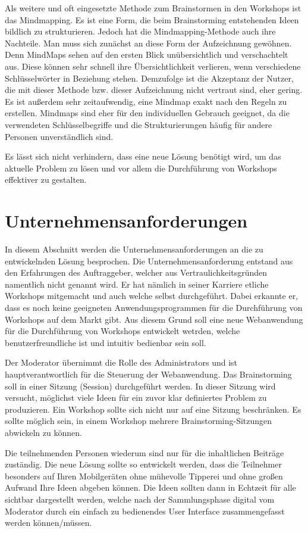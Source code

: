 Als weitere und oft eingesetzte Methode zum Brainstormen in den Workshops ist das Mindmapping. Es ist eine Form, die beim Brainstorming entstehenden Ideen bildlich zu strukturieren. Jedoch hat die Mindmapping-Methode auch ihre Nachteile. Man muss sich zunächst an diese Form der Aufzeichnung gewöhnen. Denn MindMaps sehen auf den ersten Blick unübersichtlich und verschachtelt aus. Diese können sehr schnell ihre Übersichtlichkeit verlieren, wenn verschiedene Schlüsselwörter in Beziehung stehen. Demzufolge ist die Akzeptanz der Nutzer, die mit dieser Methode bzw. dieser Aufzeichnung nicht vertraut sind, eher gering. Es ist außerdem sehr zeitaufwendig, eine Mindmap exakt nach den Regeln zu erstellen. Mindmaps sind eher für den individuellen Gebrauch geeignet, da die verwendeten Schlüsselbegriffe und die Strukturierungen häufig für andere Personen unverständlich sind.\bigskip

Es lässt sich nicht verhindern, dass eine neue Lösung benötigt wird, um das aktuelle Problem zu lösen und vor allem die Durchführung von Workshops effektiver zu gestalten.

\section{Unternehmensanforderungen}
\label{sec:unternehmensanforderungen}
In diesem Abschnitt werden die Unternehmensanforderungen an die zu entwickelnden Lösung besprochen. Die Unternehmensanforderung entstand aus den Erfahrungen des Auftraggeber, welcher aus Vertraulichkeitsgründen namentlich nicht genannt wird. Er hat nämlich in seiner Karriere etliche Workshops mitgemacht und auch welche selbst durchgeführt. Dabei erkannte er, dass es noch keine geeigneten Anwendungsprogrammen für die Durchführung von Workshops auf dem Markt gibt. Aus diesem Grund soll eine neue Webanwendung für die Durchführung von Workshops entwickelt wetrden, welche benutzerfreundliche ist und intuitiv bedienbar sein soll.\bigskip

Der Moderator übernimmt die Rolle des Administrators und ist hauptverantwortlich für die Steuerung der Webanwendung. Das Brainstorming soll in einer Sitzung (Session) durchgeführt werden. In dieser Sitzung wird versucht, möglichst viele Ideen für ein zuvor klar definiertes Problem zu produzieren. Ein Workshop sollte sich nicht nur auf eine Sitzung beschränken. Es sollte möglich sein, in einem Workshop mehrere Brainstorming-Sitzungen abwickeln zu können.\bigskip

Die teilnehmenden Personen wiederum sind nur für die inhaltlichen Beiträge zuständig. Die neue Lösung sollte so entwickelt werden, dass die Teilnehmer besonders auf Ihren Mobilgeräten ohne mühevolle Tipperei und ohne großen Aufwand Ihre Ideen abgeben können. Die Ideen sollten dann in Echtzeit für alle sichtbar dargestellt werden, welche nach der Sammlungsphase digital vom Moderator durch ein einfach zu bedienendes User Interface zusammengefasst werden können/müssen.\bigskip

